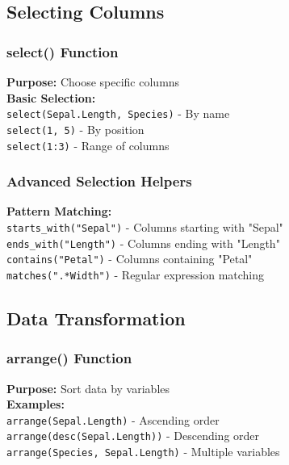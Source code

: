 \documentclass[11pt,a4paper]{article}
\begin{document}
\subsection{Selecting Columns}

\subsubsection{select() Function}

\begin{formulabox}
\textbf{Purpose:} Choose specific columns\\[0.3cm]
\textbf{Basic Selection:}\\
\texttt{select(Sepal.Length, Species)} - By name\\
\texttt{select(1, 5)} - By position\\
\texttt{select(1:3)} - Range of columns
\end{formulabox}

\subsubsection{Advanced Selection Helpers}

\begin{formulabox}
\textbf{Pattern Matching:}\\
\texttt{starts\_with("Sepal")} - Columns starting with "Sepal"\\
\texttt{ends\_with("Length")} - Columns ending with "Length"\\
\texttt{contains("Petal")} - Columns containing "Petal"\\
\texttt{matches(".*Width")} - Regular expression matching
\end{formulabox}

\subsection{Data Transformation}

\subsubsection{arrange() Function}

\begin{formulabox}
\textbf{Purpose:} Sort data by variables\\[0.3cm]
\textbf{Examples:}\\
\texttt{arrange(Sepal.Length)} - Ascending order\\
\texttt{arrange(desc(Sepal.Length))} - Descending order\\
\texttt{arrange(Species, Sepal.Length)} - Multiple variables
\end{formulabox}
\end{document}
